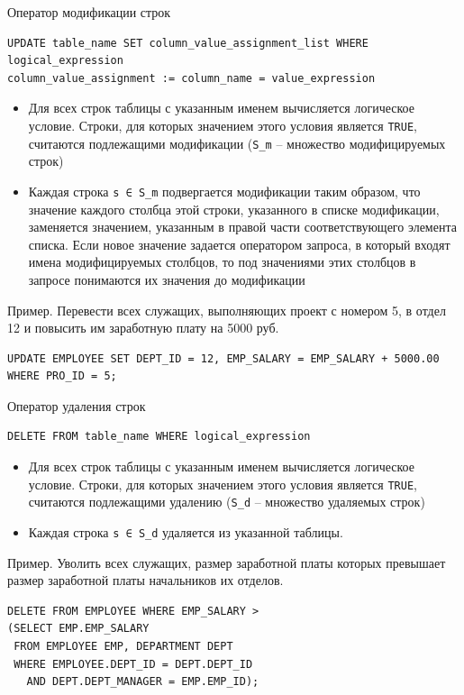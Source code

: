 \documentclass[a4paper,12pt]{article}
\begin{document}
Оператор модификации строк  
\begin{lstlisting}
UPDATE table_name SET column_value_assignment_list WHERE logical_expression
column_value_assignment := column_name = value_expression
\end{lstlisting}

\begin{itemize}
    \item Для всех строк таблицы с указанным именем вычисляется логическое условие. Строки, для которых значением этого условия является \texttt{TRUE}, считаются подлежащими модификации (\texttt{S\_m} – множество модифицируемых строк)
    \item Каждая строка \texttt{s ∈ S\_m} подвергается модификации таким образом, что значение каждого столбца этой строки, указанного в списке модификации, заменяется значением, указанным в правой части соответствующего элемента списка. Если новое значение задается оператором запроса, в который входят имена модифицируемых столбцов, то под значениями этих столбцов в запросе понимаются их значения до модификации
\end{itemize}

Пример. Перевести всех служащих, выполняющих проект с номером 5, в отдел 12 и повысить им заработную плату на 5000 руб.
\begin{lstlisting}
UPDATE EMPLOYEE SET DEPT_ID = 12, EMP_SALARY = EMP_SALARY + 5000.00 WHERE PRO_ID = 5;
\end{lstlisting}

Оператор удаления строк  
\begin{lstlisting}
DELETE FROM table_name WHERE logical_expression
\end{lstlisting}

\begin{itemize}
    \item Для всех строк таблицы с указанным именем вычисляется логическое условие. Строки, для которых значением этого условия является \texttt{TRUE}, считаются подлежащими удалению (\texttt{S\_d} – множество удаляемых строк)
    \item Каждая строка \texttt{s ∈ S\_d} удаляется из указанной таблицы.
\end{itemize}

Пример. Уволить всех служащих, размер заработной платы которых превышает размер заработной платы начальников их отделов.
\begin{lstlisting}
DELETE FROM EMPLOYEE WHERE EMP_SALARY >  
(SELECT EMP.EMP_SALARY  
 FROM EMPLOYEE EMP, DEPARTMENT DEPT  
 WHERE EMPLOYEE.DEPT_ID = DEPT.DEPT_ID  
   AND DEPT.DEPT_MANAGER = EMP.EMP_ID);
\end{lstlisting}
\end{document}
